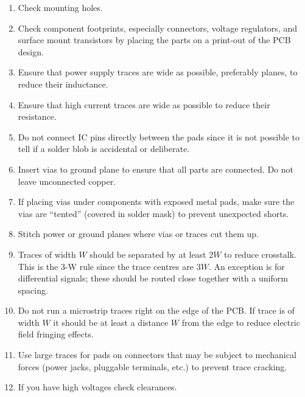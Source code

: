 \begin{enumerate}
\item Check mounting holes.

\item Check component footprints, especially connectors, voltage
  regulators, and surface mount transistors by placing the parts on a
  print-out of the PCB design.

\item Ensure that power supply traces are wide as possible, preferably
  planes, to reduce their inductance.

\item Ensure that high current traces are wide as possible to reduce
  their resistance.

\item Do not connect IC pins directly between the pads since it is not
  possible to tell if a solder blob is accidental or deliberate.

\item Insert vias to ground plane to ensure that all parts are
  connected.  Do not leave unconnected copper.


\item If placing vias under components with exposed metal pads, make
  sure the vias are ``tented'' (covered in solder mask) to prevent
  unexpected shorts.

\item Stitch power or ground planes where vias or traces cut them up.

\item Traces of width $W$ should be separated by at least $2W$ to
  reduce crosstalk.  This is the 3-W rule since the trace centres are
  $3W$.  An exception is for differential signals; these should be
  routed close together with a uniform spacing.

\item Do not run a microstrip traces right on the edge of the PCB.  If
  trace is of width $W$ it should be at least a distance $W$ from the
  edge to reduce electric field fringing effects.

\item Use large traces for pads on connectors that may be subject to
  mechanical forces (power jacks, pluggable terminals, etc.) to
  prevent trace cracking.

\item If you have high voltages check clearances.


\end{enumerate}
